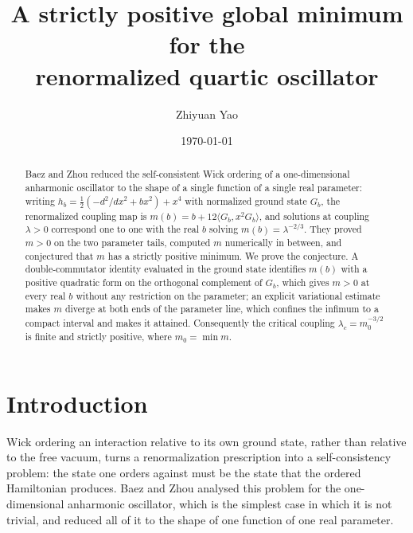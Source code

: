 \documentclass[11pt,reqno]{amsart}
\title{A strictly positive global minimum for the\\renormalized quartic oscillator}
\author{Zhiyuan Yao}
\date{\today}
\theoremstyle{plain}
\theoremstyle{definition}
\theoremstyle{remark}
\numberwithin{equation}{section}
\begin{document}
\begin{abstract}
Baez and Zhou reduced the self-consistent Wick ordering of a one-dimensional
anharmonic oscillator to the shape of a single function of a single real
parameter: writing $h_b=\tfrac12(-d^2/dx^2+bx^2)+x^4$ with normalized ground
state $G_b$, the renormalized coupling map is
$m(b)=b+12\langle G_b,x^2G_b\rangle$, and solutions at coupling $\lambda>0$
correspond one to one with the real $b$ solving $m(b)=\lambda^{-2/3}$. They
proved $m>0$ on the two parameter tails, computed $m$ numerically in between,
and conjectured that $m$ has a strictly positive minimum. We prove the
conjecture. A double-commutator identity evaluated in the ground state
identifies $m(b)$ with a positive quadratic form on the orthogonal complement
of $G_b$, which gives $m>0$ at every real $b$ without any restriction on the
parameter; an explicit variational estimate makes $m$ diverge at both ends of
the parameter line, which confines the infimum to a compact interval and makes
it attained. Consequently the critical coupling
$\lambda_c=m_0^{-3/2}$ is finite and strictly positive, where
$m_0=\min m$.
\end{abstract}

\maketitle

\section{Introduction}
\label{sec:intro}

Wick ordering an interaction relative to its own ground state, rather than
relative to the free vacuum, turns a renormalization prescription into a
self-consistency problem: the state one orders against must be the state that
the ordered Hamiltonian produces. Baez and Zhou \cite{baez1992renormalized}
analysed this problem for the one-dimensional anharmonic oscillator, which is
the simplest case in which it is not trivial, and reduced all of it to the
shape of one function of one real parameter.
\end{document}
